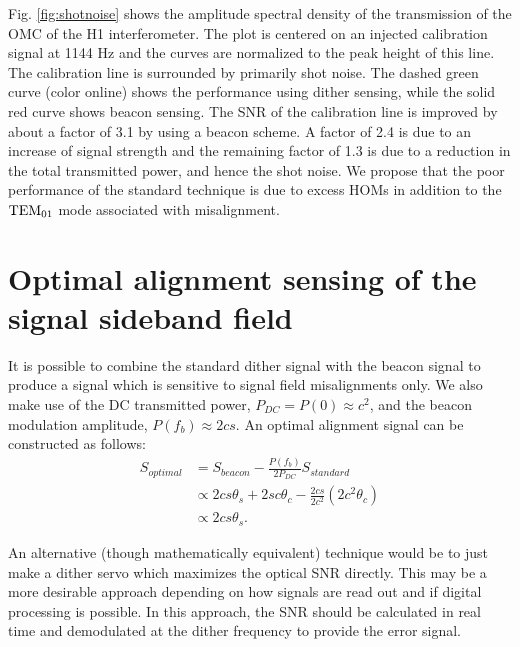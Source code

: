 Fig. %
\ref{fig:shotnoise} shows the amplitude spectral density of the transmission of the OMC of the H1 interferometer. %
The plot is centered on an injected calibration signal at 1144 Hz and the curves are normalized to the peak height of this line. %
The calibration line is surrounded by primarily shot noise. %
The dashed green curve (color online) shows the performance using dither sensing, while the solid red curve shows beacon sensing. %
The SNR of the calibration line is improved by about a factor of 3.1 by using a beacon scheme. %
A factor of 2.4 is due to an increase of signal strength and the remaining factor of 1.3 is due to a reduction in the total transmitted power, and hence the shot noise. %
We propose that the poor performance of the standard technique is due to excess HOMs in addition to the ${\rm TEM}_{01}$ mode associated with misalignment.

\section{Optimal alignment sensing of the signal sideband field}
It is possible to combine the standard dither signal with the beacon signal to produce a signal which is sensitive to signal field misalignments only. %
We also make use of the DC transmitted power, $P_{DC} = P(0) \approx c^2$, and the beacon modulation amplitude, $P(f_b) \approx 2cs$. %
An optimal alignment signal can be constructed as follows:
%
\begin{align}
\label{eq:optsig}
S_{optimal} &= S_{beacon} - \frac{P(f_b)}{2P_{DC}} S_{standard}\\
\nonumber &\propto 2cs\theta_s+2sc\theta_c-\frac{2cs}{2c^2}(2c^2\theta_c) \\
\nonumber &\propto 2cs\theta_s.
\end{align}
%

An alternative (though mathematically equivalent) technique would be to just make a dither servo which maximizes the optical SNR directly. %
This may be a more desirable approach depending on how signals are read out and if digital processing is possible. %
In this approach, the SNR should be calculated in real time and demodulated at the dither frequency to provide the error signal.

